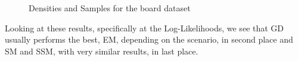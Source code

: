 \begin{figure}[H]
    \centering
    \vskip 5pt
    \vskip 5pt
    \caption{Densities and Samples for the board dataset}
    \label{fig:exp_moons}
\end{figure}
\newpage

Looking at these results, specifically at the Log-Likelihoods, we see that GD 
usually performs the best, EM, depending on the scenario, in second place
and SM and SSM, with very similar results, in last place.

